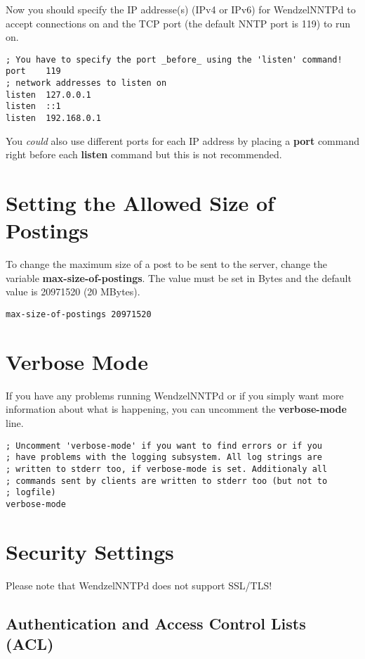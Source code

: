 Now you should specify the IP addresse(s) (IPv4 or IPv6) for WendzelNNTPd to accept connections on and the TCP port (the default NNTP port is 119) to run on.

\begin{verbatim}
; You have to specify the port _before_ using the 'listen' command!
port	119
; network addresses to listen on
listen	127.0.0.1
listen	::1
listen	192.168.0.1
\end{verbatim}

You \textit{could} also use different ports for each IP address by placing a \textbf{port} command right before each \textbf{listen} command but this is not recommended.

\section{Setting the Allowed Size of Postings}

To change the maximum size of a post to be sent to the server, change the variable \textbf{max-size-of-postings}. The value must be set in Bytes and the default value is 20971520 (20 MBytes).

\begin{verbatim}
max-size-of-postings 20971520
\end{verbatim}

\section{Verbose Mode}

If you have any problems running WendzelNNTPd or if you simply want more information about what is happening, you can uncomment the \textbf{verbose-mode} line.

\begin{verbatim}
; Uncomment 'verbose-mode' if you want to find errors or if you
; have problems with the logging subsystem. All log strings are
; written to stderr too, if verbose-mode is set. Additionaly all
; commands sent by clients are written to stderr too (but not to
; logfile)
verbose-mode
\end{verbatim}

\section{Security Settings}

Please note that WendzelNNTPd does not support SSL/TLS!

\subsection{Authentication and Access Control Lists (ACL)}

